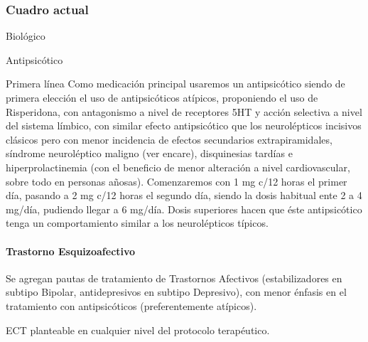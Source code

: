 \subsubsection*{Cuadro actual}
Biológico

Antipsicótico

Primera línea Como medicación principal usaremos un antipsicótico siendo de primera elección el uso de antipsicóticos atípicos, proponiendo el uso de Risperidona, con antagonismo a nivel de receptores 5HT y acción selectiva a nivel del sistema límbico, con similar efecto antipsicótico que los neurolépticos incisivos clásicos pero con menor incidencia de efectos secundarios extrapiramidales, síndrome neuroléptico maligno (ver encare), disquinesias tardías e hiperprolactinemia (con el beneficio de menor alteración a nivel cardiovascular, sobre todo en personas añosas). Comenzaremos con 1 mg c/12 horas el primer día, pasando a 2 mg c/12 horas el segundo día, siendo la dosis habitual ente 2 a 4 mg/día, pudiendo llegar a 6 mg/día. Dosis superiores hacen que éste antipsicótico tenga un comportamiento similar a los neurolépticos típicos.

\paragraph{Trastorno Esquizoafectivo}
Se agregan pautas de tratamiento de Trastornos Afectivos (estabilizadores en subtipo Bipolar, antidepresivos en subtipo Depresivo), con menor énfasis en el tratamiento con antipsicóticos (preferentemente atípicos).

ECT planteable en cualquier nivel del protocolo terapéutico.


